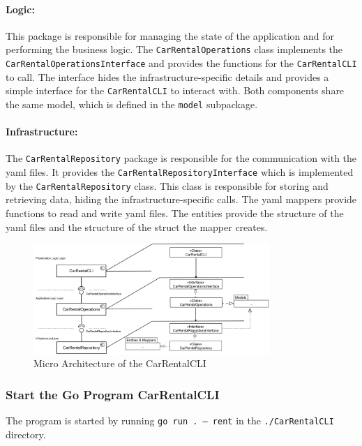 \paragraph*{Logic:}
This package is responsible for managing the state of the application and for performing the business logic.
The \texttt{CarRentalOperations} class implements the \texttt{CarRentalOperationsInterface} and provides the functions for the \texttt{CarRentalCLI} to call.
The interface hides the infrastructure-specific details and provides a simple interface for the \texttt{CarRentalCLI} to interact with.
Both components share the same model, which is defined in the \texttt{model} subpackage.

\paragraph*{Infrastructure:}
The \texttt{CarRentalRepository} package is responsible for the communication with the yaml files.
It provides the \texttt{CarRentalRepositoryInterface} which is implemented by the \texttt{CarRentalRepository} class.
This class is responsible for storing and retrieving data, hiding the infrastructure-specific calls.
The yaml mappers provide functions to read and write yaml files.
The entities provide the structure of the yaml files and the structure of the struct the mapper creates.

\begin{figure}[h]
      \centering
      \includegraphics[width=0.8\textwidth]{figures/goLang/carRental/carRentalCLI/carRentalCLI_MicroArchitecture.png}
      \caption{Micro Architecture of the CarRentalCLI}
      \label{fig:car_rental_cli_micro_architecture}
\end{figure}

\subsubsection*{Start the Go Program CarRentalCLI}
The program is started by running \texttt{go run . --- rent} in the \texttt{./CarRentalCLI} directory.

